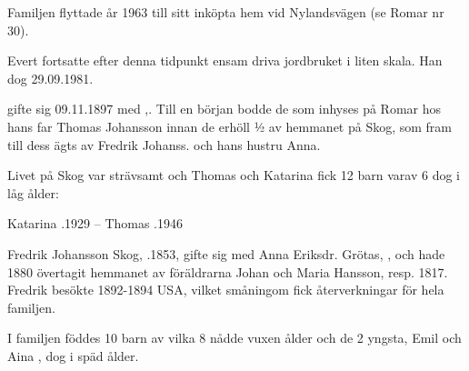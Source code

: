 Familjen flyttade år 1963 till sitt inköpta hem vid Nylandsvägen (se Romar nr 30).

Evert fortsatte efter denna tidpunkt ensam driva jordbruket i liten skala. Han dog 29.09.1981.


 gifte sig 09.11.1897 med ,. Till en början bodde de som inhyses på Romar hos hans far Thomas Johansson innan de erhöll ½ av hemmanet på Skog, som fram till dess ägts av Fredrik Johanss. och hans hustru Anna.

Livet på Skog var strävsamt och Thomas och Katarina fick 12 barn varav 6 dog i låg ålder:
\begin{jhchildren}
  \item {}
  \item {}
  \item {}
  \item {}
  \item {}
  \item {}
  \item {}
  \item {}
  \item {}
  \item {}
  \item {}
  \item {}
\end{jhchildren}

Katarina .1929 -- Thomas .1946

Fredrik Johansson Skog, .1853, gifte sig med Anna Eriksdr. Grötas,  , och hade 1880 övertagit hemmanet av föräldrarna Johan och Maria Hansson,  resp. 1817. Fredrik besökte 1892-1894 USA, vilket småningom fick återverkningar för hela familjen.

I familjen föddes 10 barn av vilka 8 nådde vuxen ålder och de 2 yngsta, Emil  och Aina , dog i späd ålder.
\begin{jhchildren}
  \item {}
  \item {}
  \item {}
  \item {}
  \item {}
  \item {}
  \item {}
  \item {}
\end{jhchildren}

